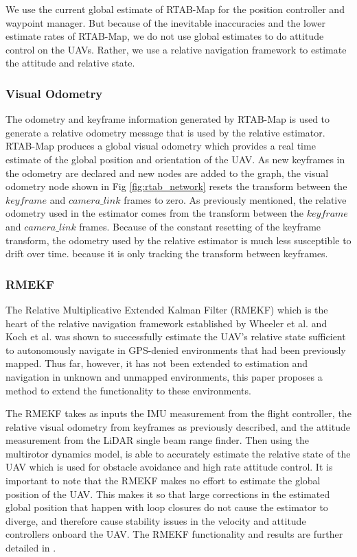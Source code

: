 \documentclass[letterpaper, 10 pt, conference]{ieeeconf}  %
\begin{document}
We use the current global estimate of RTAB-Map for the position controller and waypoint manager. But because of the inevitable inaccuracies and the lower estimate rates of RTAB-Map, we do not use global estimates to do attitude control on the UAVs. Rather, we use a relative navigation framework to estimate the attitude and relative state.

\subsubsection{Visual Odometry}

The odometry and keyframe information generated by RTAB-Map is used to generate a relative odometry message that is used by the relative estimator. RTAB-Map produces a global visual odometry which provides a real time estimate of the global position and orientation of the UAV. As new keyframes in the odometry are declared and new nodes are added to the graph, the visual odometry node shown in Fig \ref{fig:rtab_network} resets the transform between the $\mathit{keyframe}$ and $\mathit{camera\_link}$ frames to zero. As previously mentioned, the relative odometry used in the estimator comes from the transform between the $\mathit{keyframe}$ and $\mathit{camera\_link}$ frames. Because of the constant resetting of the keyframe transform, the odometry used by the relative estimator is much less susceptible to drift over time. because it is only tracking the transform between keyframes.

\subsubsection{RMEKF}

The Relative Multiplicative Extended Kalman Filter (RMEKF) which is the heart of the relative navigation framework established by Wheeler et al. \cite{Wheeler2017}\cite{Wheeler2018} and Koch et al. \cite{Koch2017} was shown to successfully estimate the UAV's relative state sufficient to autonomously navigate in GPS-denied environments that had been previously mapped. Thus far, however, it has not been extended to estimation and navigation in unknown and unmapped environments, this paper proposes a method to extend the functionality to these environments.

The RMEKF takes as inputs the IMU measurement from the flight controller, the relative visual odometry from keyframes as previously described, and the attitude measurement from the LiDAR single beam range finder. Then using the multirotor dynamics model, is able to accurately estimate the relative state of the UAV which is used for obstacle avoidance and high rate attitude control. It is important to note that the RMEKF makes no effort to estimate the global position of the UAV. This makes it so that large corrections in the estimated global position that happen with loop closures do not cause the estimator to diverge, and therefore cause stability issues in the velocity and attitude controllers onboard the UAV. The RMEKF functionality and results are further detailed in \cite{Koch2017}.
\end{document}

